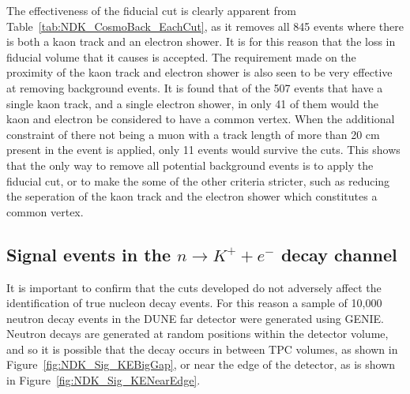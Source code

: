 The effectiveness of the fiducial cut is clearly apparent from Table~\ref{tab:NDK_CosmoBack_EachCut}, as it removes all 845 events where there is both a kaon track and an electron shower. It is for this reason that the loss in fiducial volume that it causes is accepted. The requirement made on the proximity of the kaon track and electron shower is also seen to be very effective at removing background events. It is found that of the 507 events that have a single kaon track, and a single electron shower, in only 41 of them would the kaon and electron be considered to have a common vertex. When the additional constraint of there not being a muon with a track length of more than 20 cm present in the event is applied, only 11 events would survive the cuts. This shows that the only way to remove all potential background events is to apply the fiducial cut, or to make the some of the other criteria stricter, such as reducing the seperation of the kaon track and the electron shower which constitutes a common vertex. \\

\subsection{Signal events in the $n \rightarrow K^{+} + e^{-}$ decay channel} \label{sec:NDKSig}
It is important to confirm that the cuts developed do not adversely affect the identification of true nucleon decay events. For this reason a sample of 10,000 neutron decay events in the DUNE far detector were generated using GENIE. Neutron decays are generated at random positions within the detector volume, and so it is possible that the decay occurs in between TPC volumes, as shown in Figure~\ref{fig:NDK_Sig_KEBigGap}, or near the edge of the detector, as is shown in Figure~\ref{fig:NDK_Sig_KENearEdge}. \\

